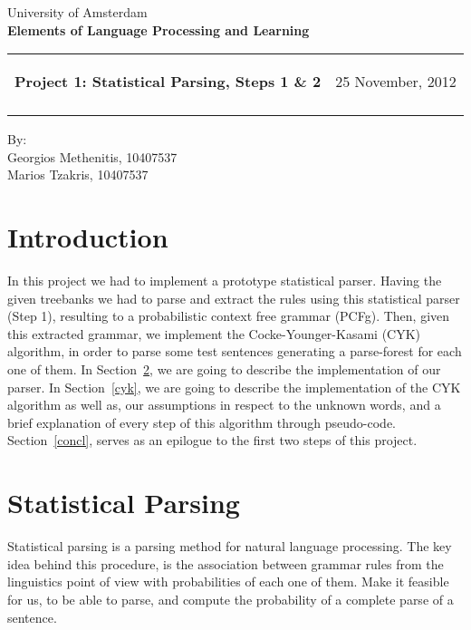 \documentclass[a4paper,11pt]{article}
\makeatletter
\newcommand{\resheading}[1]{{\large \colorbox{mygrey}{\begin{minipage}{\textwidth}{\textbf{#1 \vphantom{p\^{E}}}}\end{minipage}}}}
\newcommand{\mywebheader}{
  \begin{tabular}{@{}p{5in}p{4in}}
  {\resheading{Project 1: Statistical Parsing, Steps 1 \& 2}} & {\Large 25 November, 2012}\\\vspace{0.2cm}
  \end{tabular}}
\makeatother
\begin{document}
\begin{center}
{\Large University of Amsterdam}\\ \vspace{0.1cm}
{\LARGE \textbf{Elements of Language Processing and Learning}}\\ [1em]
\end{center}
\mywebheader

\begin{center}
{\Large By:} \\ \vspace{0.2cm}
{\Large Georgios Methenitis, 10407537} \\ \vspace{0.1cm}
{\Large Marios Tzakris, 10407537}\\
\end{center}


\section{Introduction}
In this project we had to implement a prototype statistical parser. Having the given treebanks we had to parse and extract the rules using this statistical parser (Step 1), resulting to a probabilistic context free grammar (PCFg). Then, given this extracted grammar, we implement the Cocke-Younger-Kasami (CYK) algorithm, in order to parse some test sentences generating a parse-forest for each one of them. In Section~\ref{parser}, we are going to describe the implementation of our parser. In Section~\ref{cyk}, we  
are going to describe the implementation of the CYK algorithm as well as, our assumptions in respect to the unknown words, and a brief explanation of every step of this algorithm through pseudo-code. Section~\ref{concl}, serves as an epilogue to the first two steps of this project.
 


\section{Statistical Parsing}
\label{parser}
Statistical parsing is a parsing method for natural language processing. The key idea behind this procedure, is the association between grammar rules from the linguistics point of view with probabilities of each one of them. Make it feasible for us, to be able to parse, and compute the probability of a complete parse of a sentence. 
\end{document}
